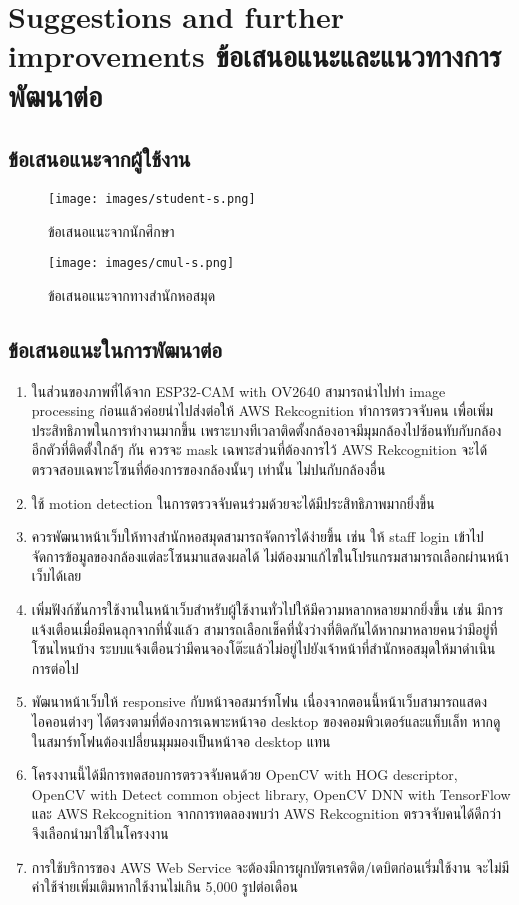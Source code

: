 \newpage
\section{\ifenglish%
Suggestions and further improvements
\else%
ข้อเสนอแนะและแนวทางการพัฒนาต่อ
\fi
}
\subsection{ข้อเสนอแนะจากผู้ใช้งาน}
\begin{figure}[ht]
    \centering
    \texttt{[image: images/student-s.png]}
    \caption[ข้อเสนอแนะจากนักศึกษา]{ข้อเสนอแนะจากนักศึกษา}
    \label{fig:st-s}
    \centering
    \texttt{[image: images/cmul-s.png]}
    \caption[ข้อเสนอแนะจากทางสำนักหอสมุด]{ข้อเสนอแนะจากทางสำนักหอสมุด}
    \label{fig:cmul-s}
\end{figure}

\subsection{ข้อเสนอแนะในการพัฒนาต่อ}
\begin{enumerate}
    \item ในส่วนของภาพที่ได้จาก ESP32-CAM with OV2640 สามารถนำไปทำ image processing ก่อนแล้วค่อยนำไปส่งต่อให้ AWS Rekcognition ทำการตรวจจับคน เพื่อเพิ่มประสิทธิภาพในการทำงานมากขึ้น เพราะบางทีเวลาติดตั้งกล้องอาจมีมุมกล้องไปซ้อนทับกับกล้องอีกตัวที่ติดตั้งใกล้ๆ กัน
    ควรจะ mask เฉพาะส่วนที่ต้องการไว้ AWS Rekcognition จะได้ตรวจสอบเฉพาะโซนที่ต้องการของกล้องนั้นๆ เท่านั้น ไม่ปนกับกล้องอื่น
    \item ใช้ motion detection ในการตรวจจับคนร่วมด้วยจะได้มีประสิทธิภาพมากยิ่งขึ้น
    \item ควรพัฒนาหน้าเว็บให้ทางสำนักหอสมุดสามารถจัดการได้ง่ายขึ้น เช่น ให้ staff login เข้าไปจัดการข้อมูลของกล้องแต่ละโซนมาแสดงผลได้ ไม่ต้องมาแก้ไขในโปรแกรมสามารถเลือกผ่านหน้าเว็บได้เลย
    \item เพิ่มฟังก์ชันการใช้งานในหน้าเว็บสำหรับผู้ใช้งานทั่วไปให้มีความหลากหลายมากยิ่งขึ้น เช่น มีการแจ้งเตือนเมื่อมีคนลุกจากที่นั่งแล้ว สามารถเลือกเช็คที่นั่งว่างที่ติดกันได้หากมาหลายคนว่ามีอยู่ที่โซนไหนบ้าง ระบบแจ้งเตือนว่ามีคนจองโต๊ะแล้วไม่อยู่ไปยังเจ้าหน้าที่สำนักหอสมุดให้มาดำเนินการต่อไป
    \item พัฒนาหน้าเว็บให้ responsive กับหน้าจอสมาร์ทโฟน เนื่องจากตอนนี้หน้าเว็บสามารถแสดงไอคอนต่างๆ ได้ตรงตามที่ต้องการเฉพาะหน้าจอ desktop ของคอมพิวเตอร์และแท็บเล็ท หากดูในสมาร์ทโฟนต้องเปลี่ยนมุมมองเป็นหน้าจอ desktop แทน
    \item โครงงานนี้ได้มีการทดสอบการตรวจจับคนด้วย OpenCV with HOG descriptor, OpenCV with Detect common object library, OpenCV DNN with TensorFlow และ AWS Rekcognition จากการทดลองพบว่า AWS Rekcognition ตรวจจับคนได้ดีกว่าจึงเลือกนำมาใช้ในโครงงาน
    \item การใช้บริการของ AWS Web Service จะต้องมีการผูกบัตรเครดิต/เดบิตก่อนเริ่มใช้งาน จะไม่มีค่าใช้จ่ายเพิ่มเติมหากใช้งานไม่เกิน 5,000 รูปต่อเดือน
\end{enumerate}

